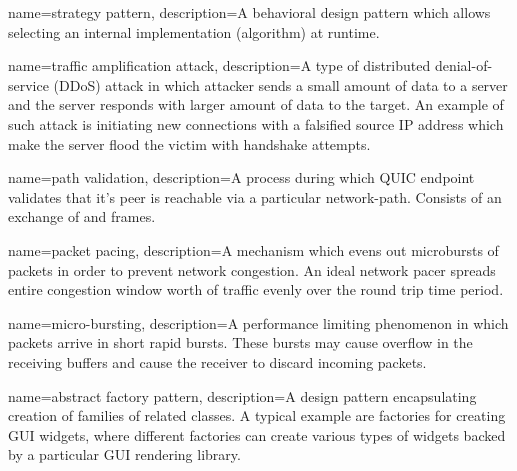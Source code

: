 {
  name=strategy pattern,
  description={A behavioral design pattern which allows selecting an internal implementation (algorithm) at runtime.}
}

{
  name=traffic amplification attack,
  description={A type of distributed denial-of-service (DDoS) attack in which attacker sends a small amount of data to a server and the server responds with larger amount of data to the target. An example of such attack is initiating new connections with a falsified source IP address which make the server flood the victim with handshake attempts.}
}

{
  name=path validation,
  description={A process during which QUIC endpoint validates that it's peer is reachable via a particular \gls{network-path}. Consists of an exchange of \PATHCHALLENGE{} and \PATHRESPONSE{} frames.}
}

{
  name=packet pacing,
  description={A mechanism which evens out microbursts of packets in order to prevent network congestion. An ideal network pacer spreads entire congestion window worth of traffic evenly over the round trip time period.}
}

{
  name=micro-bursting,
  description={A performance limiting phenomenon in which packets arrive in short rapid bursts. These bursts may cause overflow in the receiving buffers and cause the receiver to discard incoming packets.}
}

{
  name=abstract factory pattern,
  description={A design pattern encapsulating creation of families of related classes. A typical example are factories for creating GUI widgets, where different factories can create various types of widgets backed by a particular GUI rendering library.}
}



